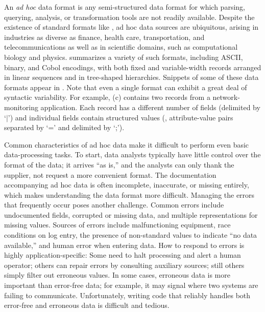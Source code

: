 \documentclass{sigplanconf}
\begin{document}
An {\em ad hoc} data format is any semi-structured data format for which
parsing, querying, analysis, or transformation tools are not readily
available.  Despite the existence of standard
formats like \xml{}, ad hoc data sources are ubiquitous,
arising in industries as diverse as finance, health care,
transportation, and telecommunications as well as in scientific
domains, such as computational biology and physics.
 summarizes a variety of such formats,
including ASCII, binary, and Cobol encodings, with both fixed and
variable-width records arranged in linear sequences and in tree-shaped
hierarchies.  Snippets of some of these data formats appear in .
Note that even a single format can exhibit a great deal of
syntactic variability.  For example, (c)
contains two records from a network-monitoring application.  
Each record has a different number of fields (delimited by `$|$') and
individual fields contain structured values (\eg{},
attribute-value pairs separated by `=' and delimited by `;').

Common characteristics of ad hoc data make it difficult to perform
even basic data-processing tasks.  To start, data analysts typically
have little control over the format of the data;  it
arrives ``as is,'' and the analysts can only thank the supplier,
not request a more convenient format.  The documentation accompanying
ad hoc data is often incomplete, inaccurate, or missing entirely,
which makes understanding the data format more difficult.
Managing the errors that frequently occur poses another challenge. Common errors include undocumented fields, corrupted or missing data, and multiple representations for missing values.  Sources of errors include
malfunctioning equipment, race conditions on log entry, the
presence of non-standard values to indicate ``no data available,'' and
human error when entering data.  How to respond to errors is highly 
application-specific: Some need to halt processing and
alert a human operator; others can repair errors by consulting 
auxiliary sources; still others simply filter out erroneous values. 
In some cases, erroneous data is more important than error-free data; 
for example, it may signal where two systems are failing to communicate.
Unfortunately, writing code that reliably handles
both error-free and erroneous data is difficult and tedious.
\end{document}
